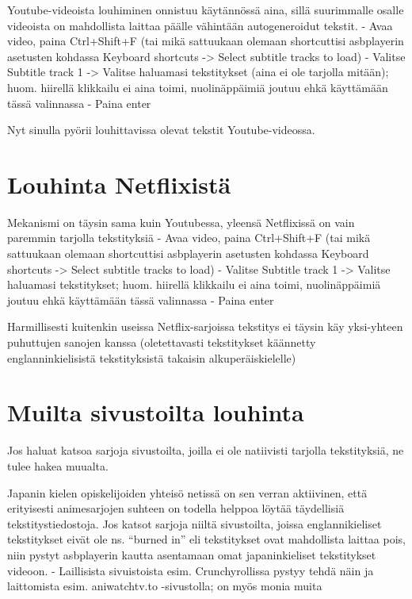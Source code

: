 \documentclass[
]{book}
\begin{document}
Youtube-videoista louhiminen onnistuu käytännössä aina, sillä suurimmalle osalle videoista on mahdollista laittaa päälle vähintään autogeneroidut tekstit.
- Avaa video, paina Ctrl+Shift+F (tai mikä sattuukaan olemaan shortcuttisi asbplayerin asetusten kohdassa Keyboard shortcuts -\textgreater{} Select subtitle tracks to load)
- Valitse Subtitle track 1 -\textgreater{} Valitse haluamasi tekstitykset (aina ei ole tarjolla mitään); huom. hiirellä klikkailu ei aina toimi, nuolinäppäimiä joutuu ehkä käyttämään tässä valinnassa
- Paina enter

Nyt sinulla pyörii louhittavissa olevat tekstit Youtube-videossa.

\section{Louhinta Netflixistä}\label{Louhinta-netflixista}

Mekanismi on täysin sama kuin Youtubessa, yleensä Netflixissä on vain paremmin tarjolla tekstityksiä
- Avaa video, paina Ctrl+Shift+F (tai mikä sattuukaan olemaan shortcuttisi asbplayerin asetusten kohdassa Keyboard shortcuts -\textgreater{} Select subtitle tracks to load)
- Valitse Subtitle track 1 -\textgreater{} Valitse haluamasi tekstitykset; huom. hiirellä klikkailu ei aina toimi, nuolinäppäimiä joutuu ehkä käyttämään tässä valinnassa
- Paina enter

Harmillisesti kuitenkin useissa Netflix-sarjoissa tekstitys ei täysin käy yksi-yhteen puhuttujen sanojen kanssa (oletettavasti tekstitykset käännetty englanninkielisistä tekstityksistä takaisin alkuperäiskielelle)

\section{Muilta sivustoilta louhinta}\label{muilta-sivustoilta-louhinta}

Jos haluat katsoa sarjoja sivustoilta, joilla ei ole natiivisti tarjolla tekstityksiä, ne tulee hakea muualta.

Japanin kielen opiskelijoiden yhteisö netissä on sen verran aktiivinen, että erityisesti animesarjojen suhteen on todella helppoa löytää täydellisiä tekstitystiedostoja.
Jos katsot sarjoja niiltä sivustoilta, joissa englannikieliset tekstitykset eivät ole ns. ``burned in'' eli tekstitykset ovat mahdollista laittaa pois, niin pystyt asbplayerin kautta asentamaan omat japaninkieliset tekstitykset videoon.
- Laillisista sivuistoista esim. Crunchyrollissa pystyy tehdä näin ja laittomista esim. aniwatchtv.to -sivustolla; on myös monia muita
\end{document}
